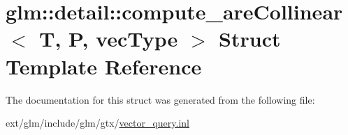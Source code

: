 \hypertarget{structglm_1_1detail_1_1compute__are_collinear}{\section{glm\-:\-:detail\-:\-:compute\-\_\-are\-Collinear$<$ T, P, vec\-Type $>$ Struct Template Reference}
\label{structglm_1_1detail_1_1compute__are_collinear}
}


The documentation for this struct was generated from the following file\-:\begin{DoxyCompactItemize}
\item 
ext/glm/include/glm/gtx/\hyperlink{vector__query_8inl}{vector\-\_\-query.\-inl}\end{DoxyCompactItemize}
